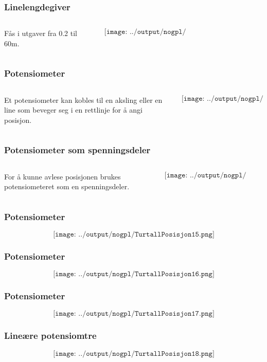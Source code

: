 \documentclass[aspectratio=169,xcolor=dvipsnames]{beamer}
\begin{document}
\begin{frame}
	\frametitle{Linelengdegiver}
	\begin{columns}
		\begin{column}{0.5\textwidth}
Fås i utgaver fra 0.2 til 60m. 
			
		\end{column}

		\begin{column}{0.5\textwidth}
	$$\texttt{[image: ../output/nogpl/TurtallPosisjon12.png]}$$
		\end{column}
	\end{columns}
\end{frame}

\begin{frame}
	\frametitle{Potensiometer}
	\begin{columns}
		\begin{column}{0.5\textwidth}
Et potensiometer kan kobles til en aksling eller en line som beveger seg i en rettlinje for å angi posisjon.
			
		\end{column}

		\begin{column}{0.5\textwidth}
	$$\texttt{[image: ../output/nogpl/TurtallPosisjon13.png]}$$
		\end{column}
	\end{columns}
\end{frame}

\begin{frame}
	\frametitle{Potensiometer som spenningsdeler}
	\begin{columns}
		\begin{column}{0.5\textwidth}
For å kunne avlese posisjonen brukes potensiometeret som en spenningsdeler. 
			
		\end{column}

		\begin{column}{0.5\textwidth}
	$$\texttt{[image: ../output/nogpl/TurtallPosisjon14.png]}$$
		\end{column}
	\end{columns}
\end{frame}

\begin{frame}
	\frametitle{Potensiometer}
	$$\texttt{[image: ../output/nogpl/TurtallPosisjon15.png]}$$
\end{frame}

\begin{frame}
	\frametitle{Potensiometer}
	$$\texttt{[image: ../output/nogpl/TurtallPosisjon16.png]}$$
\end{frame}
\begin{frame}
	\frametitle{Potensiometer}
	$$\texttt{[image: ../output/nogpl/TurtallPosisjon17.png]}$$
\end{frame}
\begin{frame}
	\frametitle{Lineære potensiomtre}
	$$\texttt{[image: ../output/nogpl/TurtallPosisjon18.png]}$$
\end{frame}
\end{document}
